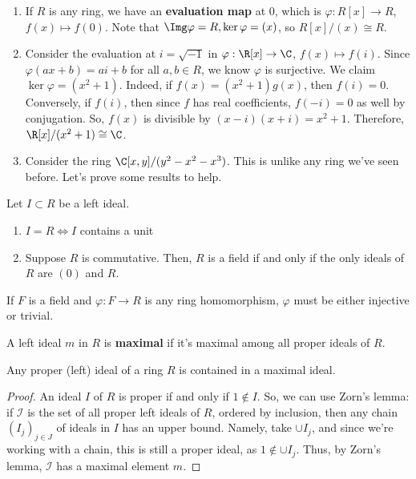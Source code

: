 \begin{ex}
    \begin{enumerate}
        \item If $R$ is any ring, we have an \textbf{evaluation map} at $0$, which is $\varphi :R[x] \to R$, $f(x) \mapsto f(0)$. Note that $\Img \varphi = R,\ker \varphi = (x)$, so $R[x]/(x) \cong R$.
        \item Consider the evaluation at $i = \sqrt{-1}$ in $\varphi :\R [x] \to \C$, $f(x) \mapsto f(i)$. Since $\varphi (ax+b)=ai+b$ for all $a,b \in R$, we know $\varphi$ is surjective. We claim $\ker \varphi = (x^2+1)$.
    Indeed, if $f(x) = (x^2+1)g(x)$, then $f(i)=0$. Conversely, if $f(i)$, then since $f$ has real coefficients, $f(-i)=0$ as well by conjugation. So, $f(x)$ is divisible by $(x-i)(x+i)=x^2+1$. Therefore, $\R[x] / (x^2+1) \cong \C$.
    \item Consider the ring $\C[x,y]/(y^2-x^2-x^3)$. This is unlike any ring we've seen before. Let's prove some results to help.
    \end{enumerate}
\end{ex}

\begin{prop}
    Let $I \subset R$ be a left ideal.
    \begin{enumerate}
        \item $I=R \iff I$ contains a unit
        \item Suppose $R$ is commutative. Then, $R$ is a field if and only if the only ideals of $R$ are $(0)$ and $R$.
    \end{enumerate}
\end{prop}

\begin{cor}
    If $F$ is a field and $\varphi :F \to R$ is any ring homomorphism, $\varphi$ must be either injective or trivial.
\end{cor}

\begin{defn}
    A left ideal $m$ in $R$ is \textbf{maximal} if it's maximal among all proper ideals of $R$.
\end{defn}

\begin{thm}
    Any proper (left) ideal of a ring $R$ is contained in a maximal ideal.
\end{thm}

\begin{proof}
    An ideal $I$ of $R$ is proper if and only if $1 \not \in I$. So, we can use Zorn's lemma: if $\mathcal I$ is the set of all proper left ideals of $R$, ordered by inclusion, then any chain $(I_j)_{j \in J}$ of ideals in $I$ has an upper bound. Namely, take $\cup I_j$, and since we're working with a chain, this is still a proper ideal, as $1 \not \in \cup I_j$. Thus, by Zorn's lemma, $\mathcal I$ has a maximal element $m$.
\end{proof}

